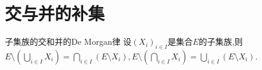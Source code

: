 \section{交与并的补集}

\begin{proposition}{子集族的交和并的De Morgan律}{}
	设$\left(X_{i}\right)_{i\in I}$是集合$E$的子集族,则$E\setminus\left(\bigcup\limits_{i\in I}X_{i}\right)=\bigcap\limits_{i\in I}\left(E\setminus X_{i}\right),E\setminus\left(\bigcap\limits_{i\in I}X_{i}\right)=\bigcup\limits_{i\in I}\left(E\setminus X_{i}\right)$.
\end{proposition}
